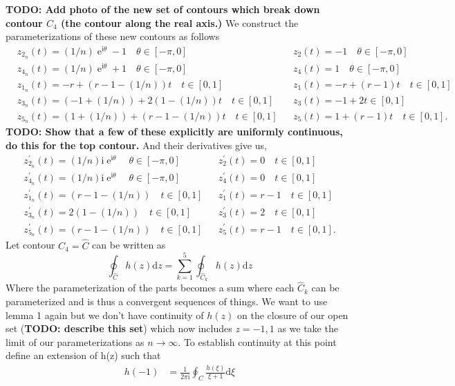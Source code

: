 \documentclass[10pt]{amsart}
\newcommand{\D}{\mathrm{d}}
\newcommand{\I}{\mathrm{i}}
\DeclareMathOperator{\E}{e}
\theoremstyle{nonumberplain}
\begin{document}
\begin{enumerate}[label={\bf {\arabic*}:}]
\begin{itemize}
\noindent
\textbf{TODO: Add photo of the new set of contours which break down contour $C_4$ (the contour along the real axis.)}
We construct the parameterizations of these new contours as follows
\begin{align*}
&z_{2_n}(t) = (1/n) \E^{\I \theta} - 1 \quad \theta \in [-\pi, 0]& &z_2(t) = -1 \quad \theta \in [-\pi, 0]& \\
&z_{4_n}(t) = (1/n) \E^{\I \theta} + 1 \quad \theta \in [-\pi, 0]& &z_4(t) = 1 \quad \theta \in [-\pi, 0]& \\
&z_{1_n}(t) = - r + (r - 1 - (1/n)) t \quad t \in [0, 1]& &z_1(t) = - r + (r - 1) t \quad t \in [0, 1]& \\
&z_{3_n}(t) = (- 1 + (1/n)) + 2(1 - (1/n))t \quad t \in [0, 1]& &z_3(t) = -1 + 2t \in [0, 1]& \\
&z_{5_n}(t) = (1 + (1/n)) + (r - 1 - (1/n))t \quad t \in [0, 1]& &z_5(t) = 1 + (r - 1)t \quad t \in [0, 1].&
\end{align*}
\textbf{TODO: Show that a few of these explicitly are uniformly continuous, do this for the top contour.}
And their derivatives give us,
\begin{align*}
&z_{2_n}^\prime(t) = (1/n) \I \E^{\I \theta} \quad \theta \in [-\pi, 0]& &z_2^\prime(t) = 0 \quad t \in [0, 1]& \\
&z_{4_n}^\prime(t) = (1/n) \I \E^{\I \theta} \quad \theta \in [-\pi, 0]& &z_4^\prime(t) = 0 \quad t \in [0, 1]& \\
&z_{1_n}^\prime(t) = (r - 1 - (1/n)) \quad t \in [0, 1]& &z_1^\prime(t) = r - 1 \quad t \in [0, 1]& \\
&z_{3_n}^\prime(t) = 2(1 - (1/n)) \quad t \in [0, 1]& &z_3^\prime(t) = 2 \quad t \in [0, 1]& \\
&z_{5_n}^\prime(t) = (r - 1 - (1/n)) \quad t \in [0, 1]& &z_5^\prime(t) = r - 1 \quad t \in [0, 1].&
\end{align*}
Let contour $C_4 = \widehat C$ can be written as
$$
\oint_{\widehat C} h(z) \D z = \sum_{k = 1}^5 \oint_{\widehat C_k} h(z) \D z
$$
Where the parameterization of the parts becomes a sum where each $\widehat C_k$ can be parameterized and is thus a convergent sequences of things.
We want to use lemma 1 again but we don't have continuity of $h(z)$ on the closure of our open set (\textbf{TODO: describe this set}) which now includes $z=-1,1$ as we take the limit of our parameterizations as $n\rightarrow \infty$.
To establish continuity at this point define an extension of h(z) such that
\begin{align*}
h(-1) &= \frac 1 {2\pi \I}\oint_C \frac {h(\xi)}{\xi + 1} \D \xi \\

\end{align*}
\end{itemize}
\end{enumerate}
\end{document}
